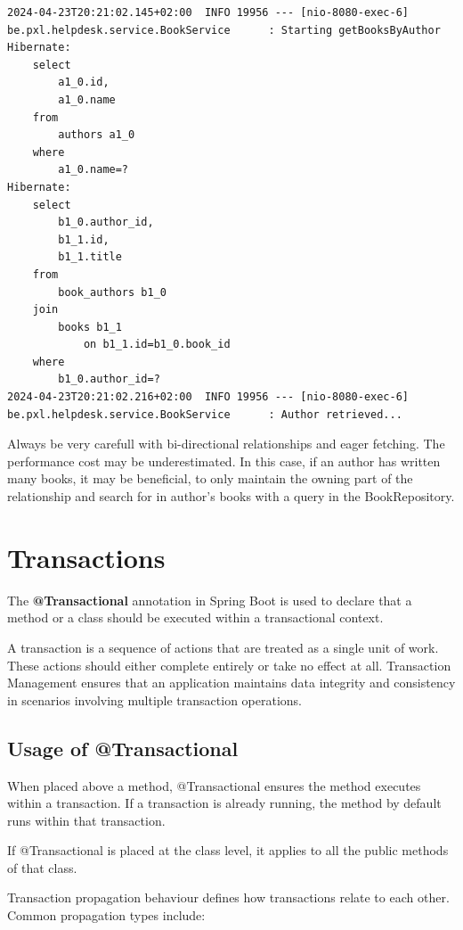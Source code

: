 \begin{verbatim}
2024-04-23T20:21:02.145+02:00  INFO 19956 --- [nio-8080-exec-6] be.pxl.helpdesk.service.BookService      : Starting getBooksByAuthor
Hibernate: 
    select
        a1_0.id,
        a1_0.name 
    from
        authors a1_0 
    where
        a1_0.name=?
Hibernate: 
    select
        b1_0.author_id,
        b1_1.id,
        b1_1.title 
    from
        book_authors b1_0 
    join
        books b1_1 
            on b1_1.id=b1_0.book_id 
    where
        b1_0.author_id=?
2024-04-23T20:21:02.216+02:00  INFO 19956 --- [nio-8080-exec-6] be.pxl.helpdesk.service.BookService      : Author retrieved...
\end{verbatim}

Always be very carefull with bi-directional relationships and eager fetching. The performance cost may be underestimated. In this case, if an author has written many books, it may be beneficial, to only maintain the owning part of the relationship and search for in author's books with a query in the BookRepository.

\section{Transactions}

The \textbf{@Transactional} annotation in Spring Boot is used to declare that a method or a class should be executed within a transactional context.

A transaction is a sequence of actions that are treated as a single unit of work. These actions should either complete entirely or take no effect at all.
Transaction Management ensures that an application maintains data integrity and consistency in scenarios involving multiple transaction operations.

\subsection{Usage of @Transactional}

When placed above a method, @Transactional ensures the method executes within a transaction. If a transaction is already running, the method by default runs within that transaction.

If @Transactional is placed at the class level, it applies to all the public methods of that class.


Transaction propagation behaviour defines how transactions relate to each other. Common propagation types include:

